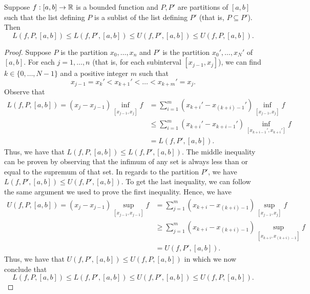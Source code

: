 \documentclass[11pt,a4paper]{book}
\begin{document}
\begin{prop}\label{Inequalities with Riemann Sums}
    Suppose \( f: [a,b] \to \mathbb{R}  \) is a bounded function and \( P, P' \) are partitions of \( [a,b] \) such that the list defining \( P  \) is a sublist of the list defining \( P' \) (that is, \( P \subseteq  P' \)). Then 
    \[  L(f,P, [a,b]) \leq L(f, P', [a,b]) \leq U(f, P', [a,b]) \leq U(f,P,[a,b]). \]
\end{prop}
\begin{proof}
    Suppose \( P  \) is the partition \( {x}_{0}, \dots, {x}_{n} \) and \( P' \) is the partition \( {x}_{0}', \dots, {x}_{N}' \) of \( [a,b] \). For each \( j = 1, \dots, n \) (that is, for each subinterval \( [{x}_{j-1}, {x}_{j}] \)), we can find \( k \in \{ 0, \dots, N-1 \} \) and a positive integer \( m  \) such that  
    \[  {x}_{j-1} = {x}_{k}' < {x}_{k+1}' < \dots < {x}_{k+m}' = {x}_{j}. \]
    Observe that
    \begin{align*}
        L(f, P, [a,b]) = ({x}_{j} - {x}_{j-1}) \inf_{[{x}_{j-1}, {x}_{j}]} f &= \sum_{ i=1  }^{  m } ({x}_{k+i}' - {x}_{(k+i)-1}') \inf_{[{x}_{j-1}, {x}_{j}]} f \\
                                                            &\leq \sum_{ i=1  }^{ m  } ({x}_{k+i}' - {x}_{k+i - 1}') \inf_{[{x}_{k+i-1}', {x}_{k+i}']}f \\
                                                            &= L(f, P', [a,b]).
\end{align*}
Thus, we have that \( L(f,P, [a,b]) \leq L(f,P', [a,b]) \). The middle inequality can be proven by observing that the infimum of any set is always less than or equal to the supremum of that set. In regards to the partition \( P'  \), we have \( L(f, P', [a,b]) \leq U(f, P', [a,b]) \). To get the last inequality, we can follow the same argument we used to prove the first inequality. Hence, we have  
    \begin{align*}
        U(f,P ,[a,b]) = ({x}_{j} - {x}_{j-1}) \sup_{[{x}_{j-1}, {x}_{j-1}]} f &= \sum_{ j=1  }^{ m  } ({x}_{k+i} - {x}_{(k+i)-1}) \sup_{[{x}_{j-1}, {x}_{j}]} f \\
                                                                              &\geq  \sum_{ j=1  }^{ m  } ({x}_{k+i} - {x}_{(k+i)-1}) \sup_{[{x}_{k+i}, {x}_{(k+i)-1}]} f \\
                                                                              &= U(f,P', [a,b]).
    \end{align*}
    Thus, we have that \( U(f,P', [a,b]) \leq U(f, P, [a,b]) \) in which we now conclude that
    \[  L(f,P, [a,b]) \leq L(f, P', [a,b]) \leq U(f, P', [a,b]) \leq U(f,P,[a,b]). \]
\end{proof}
\end{document}
